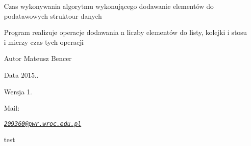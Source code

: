 Czas wykonywania algorytmu wykonującego dodawanie elementów do podatawowych struktour danych

Program realizuje operacje dodawania n liczby elementów do listy, kolejki i stosu i mierzy czas tych operacji

\begin{DoxyAuthor}{Autor}
Mateusz Bencer
\end{DoxyAuthor}
\begin{DoxyDate}{Data}
2015..
\end{DoxyDate}
\begin{DoxyVersion}{Wersja}
1.
\end{DoxyVersion}
\begin{DoxyParagraph}{}
Mail\-:
\end{DoxyParagraph}
{\itshape \href{mailto:209360@pwr.wroc.edu.pl}{\tt 209360@pwr.\-wroc.\-edu.\-pl}} 

 
 \newpage
  \begin{flushleft}
test
\end{flushleft}
  